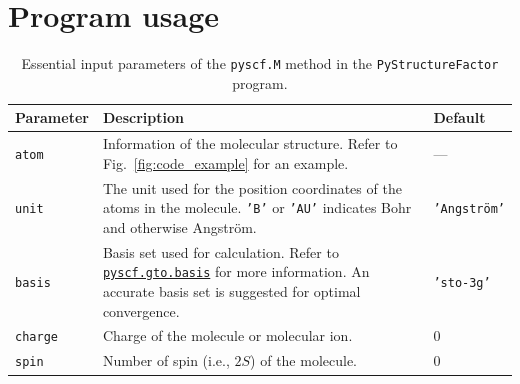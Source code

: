 \documentclass[preprint,12pt]{elsarticle} %
\begin{document}
\section{Program usage}
\label{sec:usage}

\begin{table}[tb]
    \centering
    \begin{tabular}{l p{12cm} l}
        \hline \hline
        Parameter                   & Description                                                                                       & Default\\
        \hline
        \texttt{atom}               & Information of the molecular structure. Refer to Fig.~\ref{fig:code_example} for an example.      & ---\\
        \texttt{unit}               & The unit used for the position coordinates of the atoms in the molecule.
                                      \texttt{'B'} or \texttt{'AU'} indicates Bohr and otherwise Angstr\"om.                            & \texttt{'Angstr\"om'}\\
        \texttt{basis}              & Basis set used for calculation.
                                      Refer to \href{https://pyscf.org/pyscf_api_docs/pyscf.gto.basis.html}{\texttt{pyscf.gto.basis}}
                                      for more information.
                                      An accurate basis set is suggested for optimal convergence.                                       & \texttt{'sto-3g'}\\
        \texttt{charge}             & Charge of the molecule or molecular ion.                                                          & 0 \\
        \texttt{spin}               & Number of spin (i.e., $2S$) of the molecule.                                                      & 0 \\
        \hline \hline
    \end{tabular}
    \caption{Essential input parameters of the \texttt{pyscf.M} method in the \texttt{PyStructureFactor} program.}
    \label{tab:pyscfm_param}
\end{table}
\end{document}
